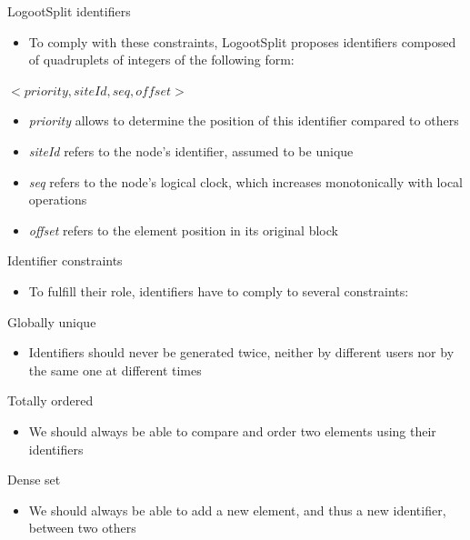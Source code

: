 \documentclass[10pt]{beamer}
\begin{document}
\begin{frame}{LogootSplit identifiers}
  \begin{itemize}
    \item To comply with these constraints, LogootSplit proposes identifiers composed of quadruplets of integers of the following form:
  \end{itemize}
  \begin{center}
    $<priority, siteId, seq, offset>$
  \end{center}
  \begin{itemize}
    \item \emph{priority} allows to determine the position of this identifier compared to others
    \item \emph{siteId} refers to the node's identifier, assumed to be unique
    \item \emph{seq} refers to the node's logical clock, which increases monotonically with local operations
    \item \emph{offset} refers to the element position in its original block
  \end{itemize}
\end{frame}

\begin{frame}{Identifier constraints}
  \begin{itemize}
    \item To fulfill their role, identifiers have to comply to several constraints:
  \end{itemize}

  \begin{block}{Globally unique}
    \begin{itemize}
      \item Identifiers should never be generated twice, neither by different users nor by the same one at different times
    \end{itemize}
  \end{block}
  \begin{block}{Totally ordered}
    \begin{itemize}
      \item We should always be able to compare and order two elements using their identifiers
    \end{itemize}
  \end{block}
  \begin{block}{Dense set}
    \begin{itemize}
      \item We should always be able to add a new element, and thus a new identifier, between two others
    \end{itemize}
  \end{block}
\end{frame}
\end{document}
